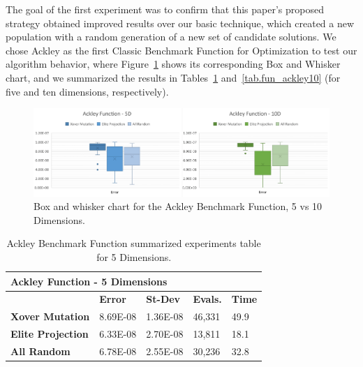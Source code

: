 \documentclass[graybox]{svmult}
\begin{document}
            The goal of the first experiment was to confirm that this paper’s
            proposed strategy obtained improved results over our basic
            technique, which created a new population with a random generation
            of a new set of candidate solutions. We chose Ackley as the first
            Classic Benchmark Function for Optimization to test our algorithm
            behavior, where Figure~\ref{fig.fun_ackley} shows its corresponding
            Box and Whisker chart, and we summarized the results in
            Tables~\ref{tab.fun_ackley5} and~\ref{tab.fun_ackley10} (for five 
            and ten dimensions, respectively).
            
            \begin{figure}
                \includegraphics[width=0.99\linewidth, frame]{img/fig_fun_ackley.pdf}
                \caption{Box and whisker chart for the Ackley Benchmark Function, 5 vs 10 Dimensions.} \label{fig.fun_ackley}
                \end{figure}

            \begin{table}[]
                \scriptsize
                \centering
                \caption{Ackley Benchmark Function summarized experiments table for 5 Dimensions.}\label{tab.fun_ackley5}
                \begin{tabular}{@{}lllll@{}}
                \toprule
                \multicolumn{5}{l}{\textbf{Ackley Function - 5 Dimensions}} \\ \midrule
                & \textbf{Error} & \textbf{St-Dev} & \textbf{Evals.} & \textbf{Time} \\
                \textbf{Xover Mutation} & 8.69E-08 & 1.36E-08 & 46,331 & 49.9 \\
                \textbf{Elite Projection} & 6.33E-08 & 2.70E-08 & 13,811 & 18.1 \\
                \textbf{All Random} & 6.78E-08 & 2.55E-08 & 30,236 & 32.8 \\ \bottomrule
                \end{tabular}
                \end{table}
\end{document}
